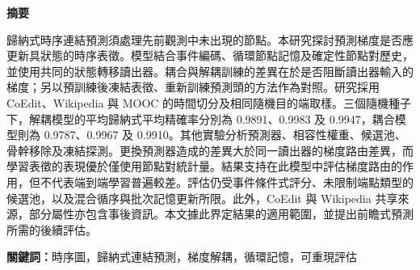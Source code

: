 \documentclass[a4paper,10pt,fleqn]{article}
\begin{document}
\vspace{18pt}
\begin{center}\fontsize{11}{16.5}\selectfont\bfseries 摘要\end{center}
\begin{list}{}{\setlength{\leftmargin}{2cm}\setlength{\rightmargin}{2cm}}\item[]
歸納式時序連結預測須處理先前觀測中未出現的節點。本研究探討預測梯度是否應更新具狀態的時序表徵。模型結合事件編碼、循環節點記憶及確定性節點對歷史，並使用共同的狀態轉移讀出器。耦合與解耦訓練的差異在於是否阻斷讀出器輸入的梯度；另以預訓練後凍結表徵、重新訓練預測頭的方法作為對照。研究採用 CoEdit、Wikipedia 與 MOOC 的時間切分及相同隨機目的端取樣。三個隨機種子下，解耦模型的平均歸納式平均精確率分別為 0.9891、0.9983 及 0.9947，耦合模型則為 0.9787、0.9967 及 0.9910。其他實驗分析預測器、相容性權重、候選池、骨幹移除及凍結探測。更換預測器造成的差異大於同一讀出器的梯度路由差異，而學習表徵的表現優於僅使用節點對統計量。結果支持在此模型中評估梯度路由的作用，但不代表端到端學習普遍較差。評估仍受事件條件式評分、未限制端點類型的候選池，以及混合循序與批次記憶更新所限。此外，CoEdit 與 Wikipedia 共享來源，部分屬性亦包含事後資訊。本文據此界定結果的適用範圍，並提出前瞻式預測所需的後續評估。

\vspace{10pt}\noindent\textbf{關鍵詞：}時序圖，歸納式連結預測，梯度解耦，循環記憶，可重現評估
\end{list}
\clearpage
\raggedcolumns
\end{document}
